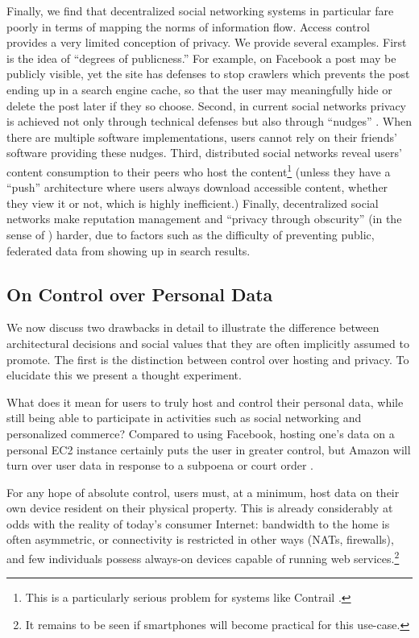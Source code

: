 \documentclass{acm_proc_article-sp}
\begin{document}
Finally, we find that decentralized social networking systems in particular fare poorly in terms of mapping the norms of information flow. Access control provides a very limited conception of privacy. We provide several examples. First is the idea of ``degrees of publicness.'' For example, on Facebook a post may be publicly visible, yet the site has defenses to stop crawlers which prevents the post ending up in a search engine cache, so that the user may meaningfully hide or delete the post later if they so choose. Second, in current social networks privacy is achieved not only through technical defenses but also through ``nudges'' \cite{privacynudges}.
When there are multiple software implementations, users cannot rely on their friends' software providing these nudges. Third, distributed social networks reveal users' content consumption to their peers who host the content\footnote{This is a particularly serious problem for systems like Contrail \cite{contrail}.} (unless they have a ``push'' architecture where users always download accessible content, whether they view it or not, which is highly inefficient.) Finally, decentralized social networks make reputation management and ``privacy through obscurity'' (in the sense of \cite{Hartzog_2010}) harder, due to factors such as the difficulty of preventing public, federated data from showing up in search results.




\subsection{On Control over Personal Data}
\label{sec:oncontrol}

We now discuss two drawbacks in detail to illustrate the difference between architectural decisions and social values that they are often implicitly assumed to promote. The first is the distinction between control over hosting and privacy. To elucidate this we present a thought experiment.

What does it mean for users to truly host and control their personal data, while still being able to participate in activities such as social networking and personalized commerce? Compared to using Facebook, hosting one's data on a personal EC2 instance certainly puts the user in greater control, but Amazon will turn over user data in response to a subpoena or court order \cite{AWSagreement}.

For any hope of absolute control, users must, at a minimum, host data on their own device resident on their physical property. This is already considerably at odds with the reality of today's consumer Internet: bandwidth to the home is often asymmetric, or connectivity is restricted in other ways (NATs, firewalls), and few individuals possess always-on devices capable of running web services.\footnote{It remains to be seen if smartphones will become practical for this use-case.}
\end{document}
